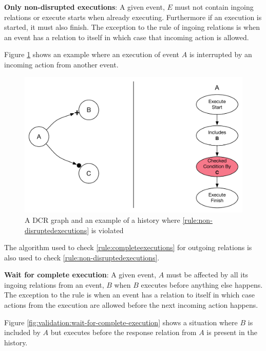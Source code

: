 	\begin{ruledef}
		\textbf{Only non-disrupted executions}: A given event, $E$ must not contain ingoing relations or execute starts when already executing. Furthermore if an execution is started, it must also finish. The exception to the rule of ingoing relations is when an event has a relation to itself in which case that incoming action is allowed.
		\label{rule:non-disruptedexecutions}
	\end{ruledef}
	
	\noindent Figure \ref{fig:validation:only-non-disrupted-executions} shows an example where an execution of event $A$ is interrupted by an incoming action from another event.
	
	\begin{figure}[H]
		\centering
		\includegraphics[width=.7\textwidth]{6validation/images/only-nondisrupted-executions.pdf}
		\caption{A DCR graph and an example of a history where \autoref{rule:non-disruptedexecutions} is violated}
		\label{fig:validation:only-non-disrupted-executions}
	\end{figure}
		
	\noindent The algorithm used to check \autoref{rule:completeexecutions} for outgoing relations is also used to check \autoref{rule:non-disruptedexecutions}.
	
	\begin{ruledef}
		\textbf{Wait for complete execution}: A given event, $A$ must be affected by all its ingoing relations from an event, $B$ when $B$ executes before anything else happens. The exception to the rule is when an event has a relation to itself in which case actions from the execution are allowed before the next incoming action happens. 
		\label{rule:wait-for-complete-execution}
	\end{ruledef}
	
	\noindent Figure \ref{fig:validation:wait-for-complete-execution} shows a situation where $B$ is included by $A$ but executes before the response relation from $A$ is present in the history.
	
